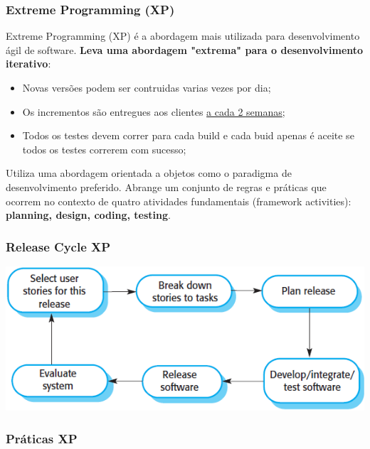 \documentclass{article}
\begin{document}
\subsubsection{Extreme Programming (XP)}

Extreme Programming (XP) é a abordagem mais utilizada para desenvolvimento
ágil de software. \textbf{Leva uma abordagem "extrema" para o desenvolvimento iterativo}:
\begin{itemize}
  \item Novas versões podem ser contruidas varias vezes por dia;
  \item Os incrementos são entregues aos clientes \uline{a cada 2 semanas};
  \item Todos os testes devem correr para cada build e cada buid apenas é aceite
  se todos os testes correrem com sucesso;
\end{itemize}

\vspace{2mm}

Utiliza uma abordagem orientada a objetos como o paradigma de desenvolvimento
preferido. Abrange um conjunto de regras e práticas que
ocorrem no contexto de quatro atividades fundamentais (framework activities):
\textbf{planning, design, coding, testing}.

\subsubsection{Release Cycle XP}

\begin{center}
  \includegraphics[scale=0.55]{22}
\end{center}

\pagebreak

\subsubsection{Práticas XP}
\end{document}
